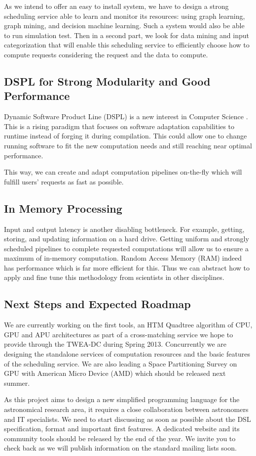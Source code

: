 			As we intend to offer an easy to install system, we have to design a strong scheduling service able to learn and monitor its resources: using graph learning, graph mining, and decision machine learning. Such a system would also be able to run simulation test. Then in a second part, we look for data mining and input categorization that will enable this scheduling service to efficiently choose how to compute requests considering the request and the data to compute.

		\subsection{DSPL for Strong Modularity and Good Performance}
			Dynamic Software Product Line (DSPL) is a new interest in Computer Science \cite{DSPL}. This is a rising paradigm that focuses on software adaptation capabilities to runtime instead of forging it during compilation. This could allow one to change running software to fit the new computation needs and still reaching near optimal performance.
			
			This way, we can create and adapt computation pipelines on-the-fly which will fulfill users' requests as fast as possible.
		
		\subsection{In Memory Processing}
			Input and output latency is another disabling bottleneck. For example, getting, storing, and updating information on a hard drive. Getting uniform and strongly scheduled pipelines to complete requested computations will allow us to ensure a maximum of in-memory computation. Random Access Memory (RAM) indeed has performance which is far more efficient for this. Thus we can abstract how to apply and fine tune this methodology from scientists in other disciplines.
			
		\subsection{Next Steps and Expected Roadmap}
			We are currently working on the first tools, an HTM Quadtree algorithm of CPU, GPU and APU architectures as part of a cross-matching service we hope to provide through the TWEA-DC during Spring 2013. Concurrently we are designing the standalone services of computation resources and the basic features of the scheduling service. We are also leading a Space Partitioning Survey on GPU with American Micro Device (AMD) which should be released next summer.
			
			As this project aims to design a new simplified programming language for the astronomical research area, it requires a close collaboration between astronomers and IT specialists. We need to start discussing as soon as possible about the DSL specification, format and important first features. A dedicated website and its community tools should be released by the end of the year. We invite you to check back as we will publish information on the standard mailing lists soon.


